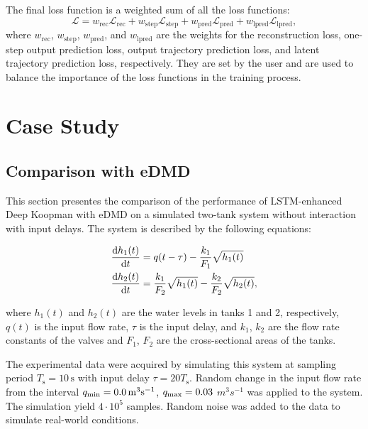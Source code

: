 \documentclass[conference]{IEEEtran}
\newcommand{\ui}[2]{#1_{\text{#2}}}  %
\begin{document}
The final loss function is a weighted sum of all the loss functions:
\begin{equation}
    \mathcal{L} = \ui{w}{rec}\mathcal{L}_{\text{rec}} + \ui{w}{step}\mathcal{L}_{\text{step}} + \ui{w}{pred}\mathcal{L}_{\text{pred}} + \ui{w}{lpred}\mathcal{L}_{\text{lpred}},
\end{equation}
where \(\ui{w}{rec}\), \(\ui{w}{step}\), \(\ui{w}{pred}\), and \(\ui{w}{lpred}\) are the weights for the reconstruction loss, one-step output prediction loss, output trajectory prediction loss, and latent trajectory prediction loss, respectively. They are set by the user and are used to balance the importance of the loss functions in the training process.

\section{Case Study}\label{sec:results}

\subsection{Comparison with eDMD}\label{subsec:results:comparison_edmd}

This section presentes the comparison of the performance of LSTM-enhanced Deep Koopman with eDMD on a simulated two-tank system without interaction with input delays. The system is described by the following equations:

\begin{equation}
    \begin{aligned}
        \diff{h_1(t)}{t} & = q(t-\tau) - \frac{k_1}{F_1}\sqrt{h_1(t)}                     \\
        \diff{h_2(t)}{t} & = \frac{k_1}{F_2}\sqrt{h_1(t)} - \frac{k_2}{F_2}\sqrt{h_2(t)},
    \end{aligned}
\end{equation}

where \(h_1(t)\) and \(h_2(t)\) are the water levels in tanks 1 and 2, respectively, \(q(t)\) is the input flow rate, \(\tau \) is the input delay, and \(k_1\), \(k_2\) are the flow rate constants of the valves and \(F_1\), \(F_2\) are the cross-sectional areas of the tanks.

The experimental data were acquired by simulating this system at sampling period \( \ui{T}{s} = 10 \, \mathrm{s} \) with input delay \( \tau = 20\ui{T}{s} \). Random change in the input flow rate from the interval \( \ui{q}{\text{min}} = 0.0 \, \unit{m^3s^{-1}} \), \( \ui{q}{\text{max}} = 0.03 \) \( \unit{m^3s^{-1}} \) was applied to the system. The simulation yield \( 4 \cdot 10^5\) samples. Random noise was added to the data to simulate real-world conditions.
\end{document}
